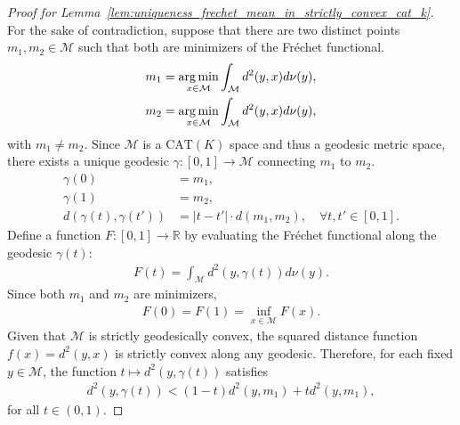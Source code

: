 \begin{proof}[Proof for Lemma~\ref{lem:uniqueness_frechet_mean_in_strictly_convex_cat_k}]
    For the sake of contradiction, suppose that there are two distinct points $m_1, m_2 \in \mathcal{M}$ such that both are minimizers of the Fréchet functional.
    \begin{align*}
        m_1 &= \operatorname*{arg\,min}_{x \in \mathcal{M}} \int_\mathcal{M} d^2(y, x)d\nu(y), \\
        m_2 &= \operatorname*{arg\,min}_{x \in \mathcal{M}} \int_\mathcal{M} d^2(y, x)d\nu(y),
    \end{align*}
    with $m_1 \neq m_2$.
    Since $\mathcal{M}$ is a $\mathrm{CAT}(K)$ space and thus a geodesic metric space, there exists a unique geodesic $\gamma \colon [0, 1] \to \mathcal{M}$ connecting $m_1$ to $m_2$.
    \begin{align*}
        \gamma(0) &= m_1, \\
        \gamma(1) &= m_2, \\
        d(\gamma(t), \gamma(t')) &= |t - t'|\cdot d(m_1, m_2), \quad \forall t, t' \in [0, 1].
    \end{align*}
    Define a function $F \colon [0, 1] \to \mathbb{R}$ by evaluating the Fréchet functional along the geodesic $\gamma(t)$:
    \begin{align*}
        F(t) = \int_\mathcal{M} d^2(y, \gamma(t))d\nu(y).
    \end{align*}
    Since both $m_1$ and $m_2$ are minimizers,
    \begin{align*}
        F(0) = F(1) = \inf_{x \in \mathcal{M}} F(x).
    \end{align*}
    Given that $\mathcal{M}$ is strictly geodesically convex, the squared distance function $f(x) = d^2(y, x)$ is strictly convex along any geodesic.
    Therefore, for each fixed $y \in \mathcal{M}$, the function $t \mapsto d^2(y, \gamma(t))$ satisfies
    \begin{align*}
        d^2(y, \gamma(t)) < (1 - t) d^2(y, m_1) + t d^2(y, m_1),
    \end{align*}
    for all $t \in (0, 1)$.


\end{proof}
